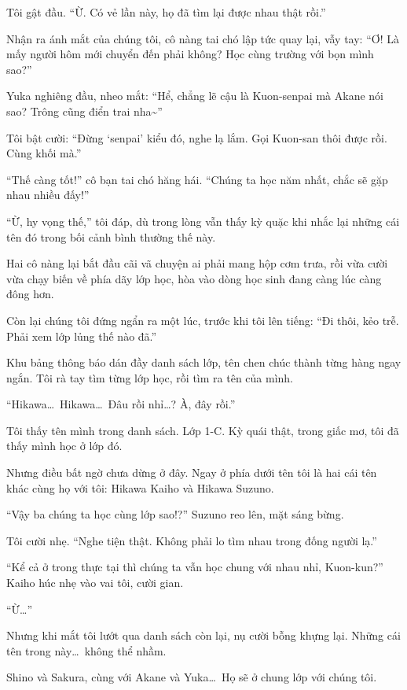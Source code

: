 \documentclass[../main.tex]{subfiles}
\begin{document}
Tôi gật đầu. ``Ừ. Có vẻ lần này, họ đã tìm lại được nhau thật rồi.''

Nhận ra ánh mắt của chúng tôi, cô nàng tai chó lập tức quay lại, vẫy tay: ``Ơ! Là mấy người hôm mới chuyển đến phải không? Học cùng trường với bọn mình sao?''

Yuka nghiêng đầu, nheo mắt: ``Hể, chẳng lẽ cậu là Kuon-senpai mà Akane nói sao? Trông cũng điển trai nha\~{}''

Tôi bật cười: ``Đừng `senpai' kiểu đó, nghe lạ lắm. Gọi Kuon-san thôi được rồi. Cùng khối mà.''

``Thế càng tốt!'' cô bạn tai chó hăng hái. ``Chúng ta học năm nhất, chắc sẽ gặp nhau nhiều đấy!''

``Ừ, hy vọng thế,'' tôi đáp, dù trong lòng vẫn thấy kỳ quặc khi nhắc lại những cái tên đó trong bối cảnh bình thường thế này.

Hai cô nàng lại bắt đầu cãi vã chuyện ai phải mang hộp cơm trưa, rồi vừa cười vừa chạy biến về phía dãy lớp học, hòa vào dòng học sinh đang càng lúc càng đông hơn.

Còn lại chúng tôi đứng ngẩn ra một lúc, trước khi tôi lên tiếng: ``Đi thôi, kẻo trễ. Phải xem lớp lủng thế nào đã.''

\ct

Khu bảng thông báo dán đầy danh sách lớp, tên chen chúc thành từng hàng ngay ngắn. Tôi rà tay tìm từng lớp học, rồi tìm ra tên của mình.

``Hikawa\dots\ Hikawa\dots\ Đâu rồi nhỉ\dots? À, đây rồi.''

Tôi thấy tên mình trong danh sách. Lớp 1-C. Kỳ quái thật, trong giấc mơ, tôi đã thấy mình học ở lớp đó.

Nhưng điều bất ngờ chưa dừng ở đây. Ngay ở phía dưới tên tôi là hai cái tên khác cùng họ với tôi: Hikawa Kaiho và Hikawa Suzuno.

``Vậy ba chúng ta học cùng lớp sao!?'' Suzuno reo lên, mặt sáng bừng.

Tôi cười nhẹ. ``Nghe tiện thật. Không phải lo tìm nhau trong đống người lạ.''

``Kể cả ở trong thực tại thì chúng ta vẫn học chung với nhau nhỉ, Kuon-kun?'' Kaiho húc nhẹ vào vai tôi, cười gian.

``Ừ\dots''

Nhưng khi mắt tôi lướt qua danh sách còn lại, nụ cười bỗng khựng lại. Những cái tên trong này\dots\ không thể nhầm.

Shino và Sakura, cùng với Akane và Yuka\dots\ Họ sẽ ở chung lớp với chúng tôi.
\end{document}

